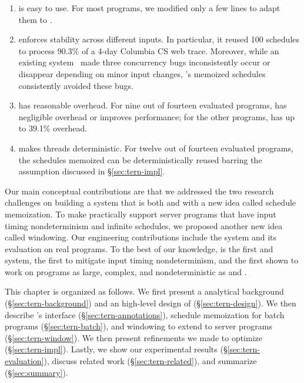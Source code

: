 \begin{enumerate}

\item \tern is easy to use.  For most programs, we modified only a few
  lines to adapt them to \tern.

\item \tern enforces stability across different inputs.  In particular, it
  reused 100 schedules to process 90.3\% of a 4-day Columbia CS web trace.
  Moreover, while an existing \dmt system~\cite{coredet:asplos10} made
  three concurrency bugs inconsistently occur or disappear depending on minor
  input changes, \tern's memoized schedules consistently avoided these bugs.

\item \tern has reasonable overhead.  For nine out of fourteen
  evaluated programs, \tern has negligible overhead or improves
  performance; for the other programs, \tern has up to 39.1\%
  overhead.

\item \tern makes threads deterministic.  For twelve out of fourteen
  evaluated programs, the schedules \tern memoized can be deterministically
  reused barring the assumption discussed in \S\ref{sec:tern-impl}.

\end{enumerate}

Our main conceptual contributions are that we addressed the two research
challenges on building a system that is both \smt and \dmt with a new idea
called schedule memoization. To make \tern practically support server programs
that have input timing nondeterminism and infinite schedules, we proposed
another new idea called windowing. Our engineering contributions include the
\tern system and its evaluation on real programs.  To the best of our knowledge,
\tern is the first \smt and \dmt system, the first to mitigate input timing
nondeterminism, and the first shown to work on programs as large, complex, and
nondeterministic as \apache and \mysql.

This chapter is organized as follows.  We first present a analytical background
(\S\ref{sec:tern-background}) and an high-level design of \tern
(\S\ref{sec:tern-design}). We then describe \tern's interface
(\S\ref{sec:tern-annotations}), schedule memoization for batch programs
(\S\ref{sec:tern-batch}), and windowing to extend \tern to server programs
(\S\ref{sec:tern-window}).  We then present refinements we made to optimize
\tern (\S\ref{sec:tern-impl}).  Lastly, we show our experimental results
(\S\ref{sec:tern-evaluation}), discuss related work (\S\ref{sec:tern-related}),
and summarize \tern (\S\ref{sec:summary}).

